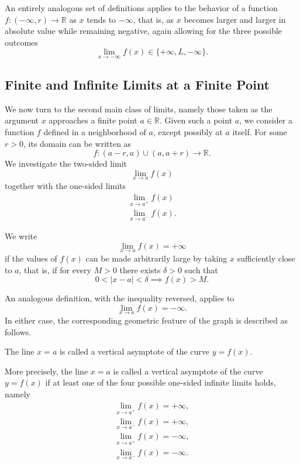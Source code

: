 An entirely analogous set of definitions applies to the behavior of a function $f : (-\infty, r) \to \mathbb{R}$ as $x$ tends to $-\infty$, that is, as $x$ becomes larger and larger in absolute value while remaining negative, again allowing for the three possible outcomes
\[
\lim_{x \to -\infty} f(x) \in \{+\infty, L, -\infty\}.
\]

\subsection{Finite and Infinite Limits at a Finite Point}


We now turn to the second main class of limits, namely those taken as the argument $x$ approaches a finite point $a \in \mathbb{R}$. Given such a point $a$, we consider a function $f$ defined in a neighborhood of $a$, except possibly at $a$ itself. For some $r > 0$, its domain can be written as
\[
f : (a-r, a) \cup (a, a+r) \to \mathbb{R}.
\]
We investigate the two-sided limit
\[
\lim_{x \to a} f(x)
\]
together with the one-sided limits
\[
\begin{gathered}
\lim_{x \to a^+} f(x) \\
\lim_{x \to a^-} f(x).
\end{gathered}
\]

\begin{definition}
We write \[
\lim_{x \to a} f(x) = +\infty
\] if the values of $f(x)$ can be made arbitrarily large by taking $x$ sufficiently close to $a$, that is, if for every $M > 0$ there exists $\delta > 0$ such that
\[
0 < |x - a| < \delta \implies f(x) > M.
\]

\end{definition}

An analogous definition, with the inequality reversed, applies to
\[
\lim_{x \to a} f(x) = -\infty.
\]
In either case, the corresponding geometric feature of the graph is described as follows.

\begin{definition}
The line $x = a$ is called a vertical asymptote of the curve $y = f(x)$.
\end{definition}

\begin{remark}
More precisely, the line $x = a$ is called a vertical asymptote of the curve $y = f(x)$ if at least one of the four possible one-sided infinite limits holds, namely
\[
\begin{gathered}
\lim_{x \to a^+} f(x) = +\infty, \\
\lim_{x \to a^-} f(x) = +\infty, \\
\lim_{x \to a^+} f(x) = -\infty, \\
\lim_{x \to a^-} f(x) = -\infty.
\end{gathered}
\]

\end{remark}

